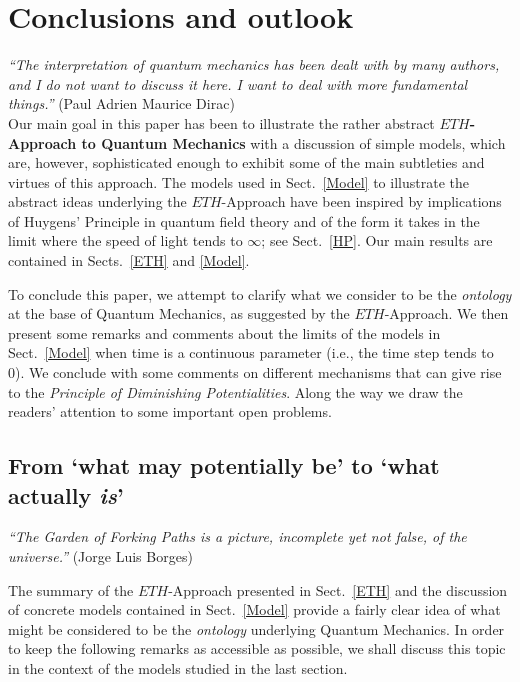 \documentclass[a4paper,11pt]{article}
\begin{document}
{\section{Conclusions and outlook}\label{Conclusions}

\hspace{0.5cm}\textit{``The interpretation of quantum mechanics has been dealt with by many authors, and I do not want to discuss it here. I want to deal with more fundamental things.''} (Paul Adrien Maurice Dirac)\\

Our main goal in this paper has been to illustrate the rather abstract {\bf{$ETH$-Approach to Quantum Mechanics}} 
with a discussion of simple models, which are, however, sophisticated enough to exhibit some of the main subtleties 
and virtues of this approach. The models used in Sect.~\ref{Model} to illustrate the abstract ideas underlying the 
$ETH$-Approach have been inspired by implications of Huygens' Principle in quantum field theory and of the form 
it takes in the limit where the speed of light tends to $\infty$; see Sect.~\ref{HP}. Our main results are contained in
Sects.~\ref{ETH} and \ref{Model}.

To conclude this paper, we attempt to clarify what we consider to be the \textit{ontology} at the base of Quantum 
Mechanics, as suggested by the $ETH$-Approach. We then present some remarks and comments about the limits of 
the models in Sect.~\ref{Model} when time is a continuous parameter (i.e., the time step tends to 0). We conclude 
with some comments on different mechanisms that can give rise to the \textit{Principle of Diminishing Potentialities}. 
Along the way we draw the readers' attention to some important open problems.

\subsection{From `what may potentially be' to `what actually \textit{is}'}

\hspace{0.5cm}\textit{``The Garden of Forking Paths is a picture, incomplete yet not false, of the universe.''} (Jorge Luis Borges)

The summary of the $ETH$-Approach presented in Sect.~\ref{ETH} and the discussion of concrete models contained 
in Sect.~\ref{Model} provide a fairly clear idea of what might be considered to be the \textit{ontology} underlying Quantum 
Mechanics. In order to keep the following remarks as accessible as possible, we shall discuss this topic in the 
context of the models studied in the last section.

}
\end{document}
